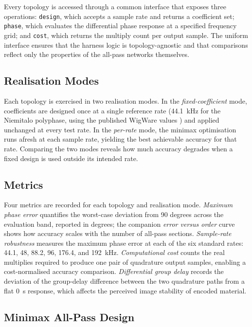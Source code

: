 \documentclass[11pt,a4paper]{article}
\begin{document}
Every topology is accessed through a common interface that exposes three
operations: \texttt{design}, which accepts a sample rate and returns a
coefficient set; \texttt{phase}, which evaluates the differential phase
response at a specified frequency grid; and \texttt{cost}, which returns the
multiply count per output sample.
The uniform interface ensures that the harness logic is topology-agnostic and
that comparisons reflect only the properties of the all-pass networks
themselves.

\subsection{Realisation Modes}

Each topology is exercised in two realisation modes.
In the \emph{fixed-coefficient} mode, coefficients are designed once at a
single reference rate (\SI{44.1}{\kilo\hertz} for the Niemitalo polyphase, using
the published WigWare values \cite{WigginsWigWare}) and applied unchanged at
every test rate.
In the \emph{per-rate} mode, the minimax optimisation runs afresh at each
sample rate, yielding the best achievable accuracy for that rate.
Comparing the two modes reveals how much accuracy degrades when a fixed
design is used outside its intended rate.

\subsection{Metrics}

Four metrics are recorded for each topology and realisation mode.
\emph{Maximum phase error} quantifies the worst-case deviation from 90 degrees
across the evaluation band, reported in degrees; the companion \emph{error
versus order} curve shows how accuracy scales with the number of all-pass
sections.
\emph{Sample-rate robustness} measures the maximum phase error at each of the
six standard rates: 44.1, 48, 88.2, 96, 176.4, and \SI{192}{\kilo\hertz}.
\emph{Computational cost} counts the real multiplies required to produce one
pair of quadrature output samples, enabling a cost-normalised accuracy
comparison.
\emph{Differential group delay} records the deviation of the group-delay
difference between the two quadrature paths from a flat \SI{0}{\second}
response, which affects the perceived image stability of encoded material.

\subsection{Minimax All-Pass Design}
\end{document}
